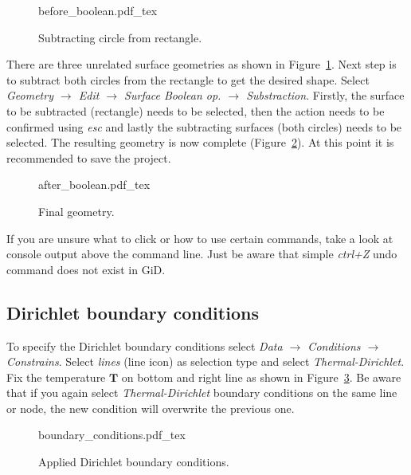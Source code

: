\documentclass[10pt,a4paper]{article}
\begin{document}
\begin{figure}[ht]
	\centering
	\footnotesize
    \def\svgwidth{0.9\textwidth}{before_boolean.pdf_tex}
	\caption{Subtracting circle from rectangle.}
	\label{im:before_boolean}
\end{figure}

There are three unrelated surface geometries as shown in Figure~\ref{im:before_boolean}. Next step is to subtract both circles from the rectangle to get the desired shape. Select \textit{Geometry $\rightarrow$ Edit $\rightarrow$ Surface Boolean op. $\rightarrow$ Substraction}. Firstly, the surface to be subtracted (rectangle) needs to be selected, then the action needs to be confirmed using \textit{esc} and lastly the subtracting surfaces (both circles) needs to be selected. The resulting geometry is now complete (Figure~\ref{im:after_boolean}). At this point it is recommended to save the project. \\

\begin{figure}[ht]
	\centering
	\footnotesize
    \def\svgwidth{0.6\textwidth}{after_boolean.pdf_tex}
	\caption{Final geometry.}
	\label{im:after_boolean}
\end{figure}

If you are unsure what to click or how to use certain commands, take a look at console output above the command line. Just be aware that simple \textit{ctrl+Z} undo command does not exist in GiD.


\subsection{Dirichlet boundary conditions}

To specify the Dirichlet boundary conditions select \textit{Data $\rightarrow$ Conditions $\rightarrow$ Constrains}. Select \textit{lines} (line icon) as selection type and select \textit{Thermal-Dirichlet}. Fix the temperature $\mathbf{T}$ on bottom and right line as shown in Figure~\ref{im:boundary_conditions}. Be aware that if you again select \textit{Thermal-Dirichlet} boundary conditions on the same line or node, the new condition will overwrite the previous one.


\begin{figure}[ht]
	\centering
	\footnotesize
    \def\svgwidth{0.9\textwidth}{boundary_conditions.pdf_tex}
	\caption{Applied Dirichlet boundary conditions.}
	\label{im:boundary_conditions}
\end{figure}
\end{document}
